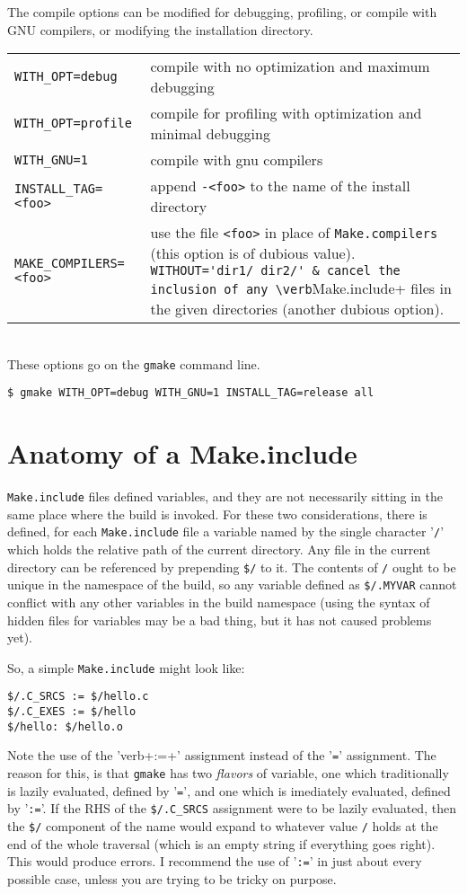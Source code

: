 \documentclass[letterpaper]{article}
\begin{document}
The compile options can be modified for debugging, profiling, or
compile with GNU compilers, or modifying the installation directory.\\
\begin{tabular}{ll}
\verb+WITH_OPT=debug+ & compile with no optimization and maximum debugging\\
\verb+WITH_OPT=profile+ & compile for profiling with optimization and minimal debugging\\
\verb+WITH_GNU=1+ & compile with gnu compilers\\
\verb+INSTALL_TAG=<foo>+ & append \verb+-<foo>+ to the name of the install directory\\
\verb+MAKE_COMPILERS=<foo>+ & use the file \verb+<foo>+ in place of \verb+Make.compilers+ (this option is of dubious value).
\verb+WITHOUT='dir1/ dir2/' & cancel the inclusion of any \verb+Make.include+ files in the given directories (another dubious option).
\end{tabular}\\
These options go on the \verb+gmake+ command line.
\begin{verbatim}
$ gmake WITH_OPT=debug WITH_GNU=1 INSTALL_TAG=release all
\end{verbatim}

\section{Anatomy of a Make.include}

\verb+Make.include+ files defined variables, and they are not
necessarily sitting in the same place where the build is invoked.  For
these two considerations, there is defined, for each
\verb+Make.include+ file a variable named by the single character
'\verb+/+' which holds the relative path of the current directory.
Any file in the current directory can be referenced by prepending
\verb+$/+ to it.  The contents of \verb+/+ ought to be unique in the
namespace of the build, so any variable defined as \verb+$/.MYVAR+
cannot conflict with any other variables in the build namespace (using
the syntax of hidden files for variables may be a bad thing, but it
has not caused problems yet).

So, a simple \verb+Make.include+ might look like:
\begin{verbatim}
$/.C_SRCS := $/hello.c
$/.C_EXES := $/hello
$/hello: $/hello.o
\end{verbatim}

Note the use of the 'verb+:=+' assignment instead of the '\verb+=+'
assignment.  The reason for this, is that \verb+gmake+ has two {\em flavors}
of variable, one which traditionally is lazily evaluated, defined by
'\verb+=+', and one which is imediately evaluated, defined by '\verb+:=+'.
If the RHS of the \verb+$/.C_SRCS+ assignment were to be lazily
evaluated, then the \verb+$/+ component of the name would expand to
whatever value \verb+/+ holds at the end of the whole traversal
(which is an empty string if everything goes right).  This would
produce errors.  I recommend the use of '\verb+:=+' in just about
every possible case, unless you are trying to be tricky on purpose.
\end{document}
